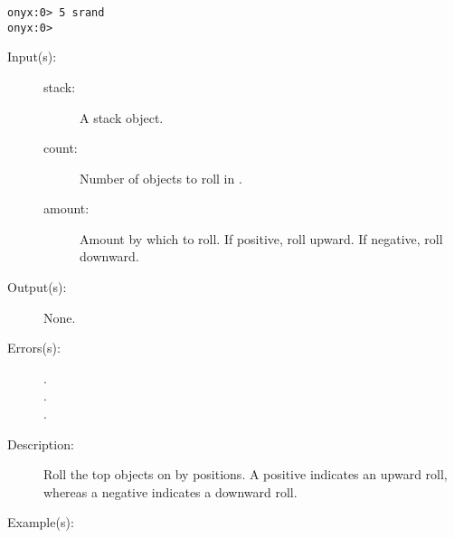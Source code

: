 \begin{description}
\begin{description}
\begin{verbatim}
onyx:0> 5 srand
onyx:0>
		\end{verbatim}
	\end{description}
\label{systemdict:sroll}
\item[{\onyxop{stack count amount}{sroll}{--}}: ]
	\begin{description}\item[]
	\item[Input(s): ]
		\begin{description}\item[]
		\item[stack: ]
			A stack object.
		\item[count: ]
			Number of objects to roll in .
		\item[amount: ]
			Amount by which to roll.  If positive, roll
			upward.  If negative, roll downward.
		\end{description}
	\item[Output(s): ] None.
	\item[Errors(s): ]
		\begin{description}\item[]
		\item[.]
		\item[.]
		\item[.]
		\end{description}
	\item[Description: ]
		Roll the top  objects on  by
		 positions.  A positive 
		indicates an upward roll, whereas a negative 
		indicates a downward roll.
	\item[Example(s): ]\begin{verbatim}


\end{verbatim}
\end{description}
\end{description}
